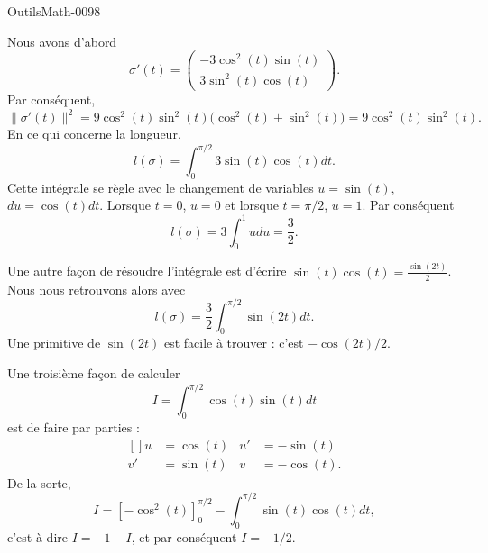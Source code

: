
\begin{corrige}{OutilsMath-0098}

    Nous avons d'abord
    \begin{equation}
        \sigma'(t)=\begin{pmatrix}
            -3\cos^2(t)\sin(t)    \\ 
            3\sin^2(t)\cos(t)    
        \end{pmatrix}.
    \end{equation}
    Par conséquent,
    \begin{equation}
        \| \sigma'(t) \|^2=9\cos^2(t)\sin^2(t)\big( \cos^2(t)+\sin^2(t) \big)=9\cos^2(t)\sin^2(t).
    \end{equation}
    En ce qui concerne la longueur,
    \begin{equation}
        l(\sigma)=\int_0^{\pi/2}3\sin(t)\cos(t)dt.
    \end{equation}
    Cette intégrale se règle avec le changement de variables $u=\sin(t)$, $du=\cos(t)dt$. Lorsque $t=0$, $u=0$ et lorsque $t=\pi/2$, $u=1$. Par conséquent
    \begin{equation}
        l(\sigma)=3\int_0^1 udu=\frac{ 3 }{2}.
    \end{equation}

    Une autre façon de résoudre l'intégrale est d'écrire $\sin(t)\cos(t)=\frac{ \sin(2t) }{2}$. Nous nous retrouvons alors avec
    \begin{equation}
        l(\sigma)=\frac{ 3 }{ 2 }\int_0^{\pi/2}\sin(2t)dt.
    \end{equation}
    Une primitive de $\sin(2t)$ est facile à trouver : c'est $-\cos(2t)/2$.

    Une troisième façon de calculer
    \begin{equation}
        I=\int_0^{\pi/2}\cos(t)\sin(t)dt
    \end{equation}
    est de faire par parties :
    \begin{equation}
        \begin{aligned}[]
            u&=\cos(t)&u'&=-\sin(t)\\
            v'&=\sin(t)&v&=-\cos(t).
        \end{aligned}
    \end{equation}
    De la sorte,
    \begin{equation}
        I=\left[ -\cos^2(t) \right]_0^{\pi/2}-\int_0^{\pi/2}\sin(t)\cos(t)dt,
    \end{equation}
    c'est-à-dire $I=-1-I$, et par conséquent $I=-1/2$.
\end{corrige}
